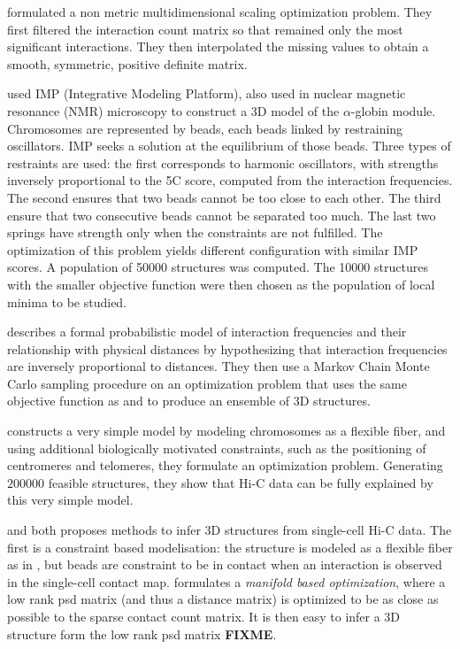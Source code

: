 \citet{ben-elazar:spatial} formulated a non metric multidimensional scaling
optimization problem. They first filtered the interaction count matrix so that
remained only the most significant interactions. They then interpolated the
missing values to obtain a smooth, symmetric, positive definite matrix.

\citet{bau:three-dimensional} used IMP (Integrative Modeling Platform), also
used in nuclear magnetic resonance (NMR) microscopy to construct a 3D model of
the $\alpha$-globin module. Chromosomes are represented by beads, each beads
linked by restraining oscillators. IMP seeks a solution at the equilibrium of
those beads. Three types of restraints are used: the first  corresponds to
harmonic oscillators, with strengths inversely proportional to the 5C
score, computed from the interaction frequencies. The second ensures that two
beads cannot be too close to each other. The third ensure that two consecutive
beads cannot be separated too much. The last two springs have strength only
when the constraints are not fulfilled. The optimization of this problem
yields different configuration with similar IMP scores. A population of 50000
structures was computed. The 10000 structures with the smaller objective
function were then chosen as the population of local minima to be studied.

\citet{rousseau:three} describes a formal probabilistic model of interaction
frequencies and their relationship with physical distances by hypothesizing
that interaction frequencies are inversely proportional to distances. They
then use a Markov Chain Monte Carlo sampling procedure on an optimization
problem that uses the same objective function as \citet{tanizawa:mapping} and
\citet{duan:three} to produce an ensemble of 3D structures.

\citet{tjong:physical} constructs a very simple model by modeling chromosomes
as a flexible fiber, and using additional biologically motivated constraints,
such as the positioning of centromeres and telomeres, they formulate an
optimization problem. Generating $200000$ feasible structures, they show that
Hi-C data can be fully explained by this very simple model.

\citet{nagano:single-cell} and \citet{paulsen:manifold} both proposes methods
to infer 3D structures from single-cell Hi-C data. The first is a constraint
based modelisation: the structure is modeled as a flexible fiber as in
\citet{tjong:physical}, but beads are constraint to be in contact when an
interaction is observed in the single-cell contact map.
\citet{paulsen:manifold} formulates a \textit{manifold based optimization},
where a low rank psd matrix (and thus a distance matrix) is optimized to be as
close as possible to the sparse contact count matrix. It is then easy to infer
a 3D structure form the low rank psd matrix \textbf{FIXME}.

